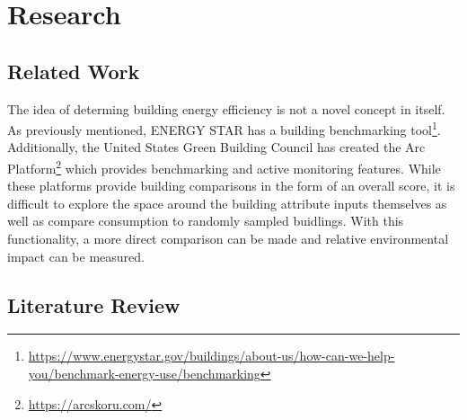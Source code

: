 \section*{Research}
\label{sec:literature_review}

\subsection{Related Work}
The idea of determing building energy efficiency is not a novel concept in itself.  As previously mentioned, ENERGY STAR has a building benchmarking tool\footnote{\href{https://www.energystar.gov/buildings/about-us/how-can-we-help-you/benchmark-energy-use/benchmarking }{\url{https://www.energystar.gov/buildings/about-us/how-can-we-help-you/benchmark-energy-use/benchmarking}}}.  Additionally, the United States Green Building Council has created the Arc Platform\footnote{\href{https://arcskoru.com/}{https://arcskoru.com/}} which provides benchmarking and active monitoring features.  While these platforms provide building comparisons in the form of an overall score, it is difficult to explore the space around the building attribute inputs themselves as well as compare consumption to randomly sampled buidlings.  With this functionality, a more direct comparison can be made and relative environmental impact can be measured.

\subsection{Literature Review}

